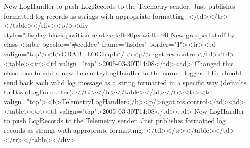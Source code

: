 	      New LogHandler to push LogRecords to the Telemetry sender. Just publishes formatted log records
	      as strings with appropriate formatting.
	    </td></tr></table></div><p/><div style="display:block;position:relative;left:20px;width:90%
     New grouped stuff by class
     <table bgcolor="#ccddee" frame="hsides" border="1"><tr><td valign="top"><b>GRAB_LOGImpl</b><p/>ngat.rcs.control</td><td><table><tr><td valign="top">2005-03-30T14:08</td><td>
	    Changed this class soas to add a new TelemetryLogHandler to the named logger. This should send
	    back each valid log message as a string formatted in a specific way (defaults to BasicLogFormatter).
	  </td></tr></table></td></tr><tr><td valign="top"><b>TelemetryLogHandler</b><p/>ngat.rcs.control</td><td><table><tr><td valign="top">2005-03-30T14:08</td><td>
	      New LogHandler to push LogRecords to the Telemetry sender. Just publishes formatted log records
	      as strings with appropriate formatting.
	    </td></tr></table></td></tr></table></div>